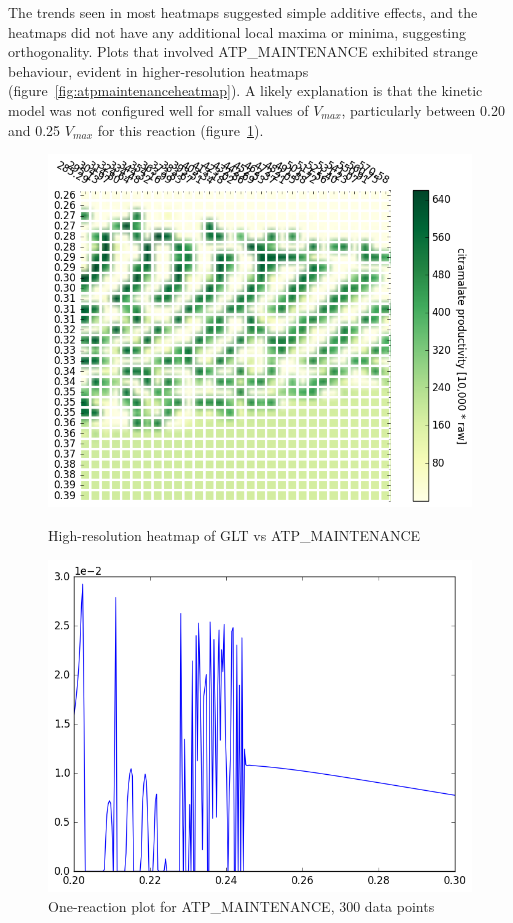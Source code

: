 \documentclass[parskip=full, numbers=noenddot]{scrreprt}
\begin{document}
The trends seen in most heatmaps suggested simple additive effects, and the heatmaps did not have any additional local maxima or minima, suggesting orthogonality. Plots that involved ATP\_MAINTENANCE exhibited strange behaviour, evident in higher-resolution heatmaps (figure~\ref{fig:atpmaintenanceheatmap}). A likely explanation is that the kinetic model was not configured well for small values of $V_{max}$, particularly between 0.20 and 0.25 $V_{max}$ for this reaction (figure~\ref{fig:atpmaintenanceonereac}).

\begin{figure}[hp]
  \centering
  \includegraphics[scale=0.5]{atpmaintenanceheatmap}
  \caption{High-resolution heatmap of GLT vs ATP\_MAINTENANCE}
  \label{fig:atpmaintenanceheatmap}

  \includegraphics[scale=0.5]{atpmaintenanceonereac}
  \caption{One-reaction plot for ATP\_MAINTENANCE, 300 data points}
  \label{fig:atpmaintenanceonereac}
\end{figure}
\end{document}
